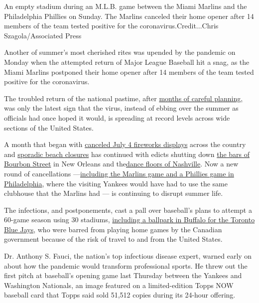 An empty stadium during an M.L.B. game between the Miami Marlins and the
Philadelphia Phillies on Sunday. The Marlins canceled their home opener
after 14 members of the team tested positive for the
coronavirus.Credit...Chris Szagola/Associated Press

Another of summer's most cherished rites was upended by the pandemic on
Monday when the attempted return of Major League Baseball hit a snag, as
the Miami Marlins postponed their home opener after 14 members of the
team tested positive for the coronavirus.

The troubled return of the national pastime, after
\href{https://www.nytimes3xbfgragh.onion/2020/07/25/sports/rob-manfred-mlb-season.html}{months
of careful planning,} was only the latest sign that the virus, instead
of ebbing over the summer as officials had once hoped it would, is
spreading at record levels across wide sections of the United States.

A month that began with
\href{https://www.nytimes3xbfgragh.onion/2020/07/02/us/coronavirus-fourth-of-july.html}{canceled
July 4 fireworks displays} across the country and
\href{https://www.miamigov.com/Notices/News-Media/4th-of-July-Weekend-in-the-City-of-Miami}{sporadic
beach closures} has continued with edicts shutting down
\href{https://www.nola.com/news/coronavirus/article_0a3bbc54-ce03-11ea-97ba-cfbad95a9c94.html}{the
bars of Bourbon Street} in New Orleans and
the\href{https://www.asafenashville.org/roadmap-for-reopening-nashville-phase-2-guidance-and-resources/}{dance
floors of Nashville}. Now a new round of cancellations
---\href{https://www.nytimes3xbfgragh.onion/2020/07/27/sports/baseball/marlins-game-canceled.html}{including
the Marlins game and a Phillies game in Philadelphia}, where the
visiting Yankees would have had to use the same clubhouse that the
Marlins had --- is continuing to disrupt summer life.

The infections, and postponements, cast a pall over baseball's plans to
attempt a 60-game season using 30 stadiums,
\href{https://www.nytimes3xbfgragh.onion/2020/07/24/sports/baseball/blue-jays-buffalo.html}{including
a ballpark in Buffalo for the Toronto Blue Jays}, who were barred from
playing home games by the Canadian government because of the risk of
travel to and from the United States.

Dr. Anthony S. Fauci, the nation's top infectious disease expert, warned
early on about how the pandemic would transform professional sports. He
threw out the first pitch at baseball's opening game last Thursday
between the Yankees and Washington Nationals, an image featured on a
limited-edition Topps NOW baseball card that Topps said sold 51,512
copies during its 24-hour offering.

